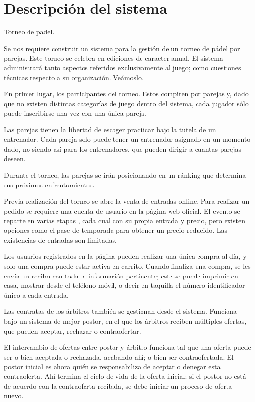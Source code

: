 \section{Descripción del sistema}
Torneo de padel.

Se nos requiere construir un sistema para la gestión de un torneo de pádel por parejas. Este torneo se celebra en ediciones de caracter anual. El sistema administrará tanto aspectos referidos exclusivamente al juego; como cuestiones técnicas respecto a su organización. Veámoslo.


En primer lugar, los participantes del torneo. Estos compiten por parejas y, dado que no existen distintas categorías de juego dentro del sistema, cada jugador sólo puede inscribirse una vez con una única pareja.

Las parejas tienen la libertad de escoger practicar bajo la tutela de un entrenador. Cada pareja solo puede tener un entrenador asignado en un momento dado, no siendo así para los entrenadores, que pueden dirigir a cuantas parejas deseen. 

Durante el torneo, las parejas se irán posicionando en un ránking que determina sus próximos enfrentamientos.


Previa realización del torneo se abre la venta de entradas online. Para realizar un pedido se requiere una cuenta de usuario en la página web oficial. El evento se reparte en varias etapas , cada cual con su propia entrada y precio, pero existen opciones como el pase de temporada para obtener un precio reducido. Las existencias de entradas son limitadas.

Los usuarios registrados en la página pueden realizar una única compra al día, y solo una compra puede estar activa en carrito. Cuando finaliza una compra, se les envía un recibo con toda la información pertinente; este se puede imprimir en casa, mostrar desde el teléfono móvil, o decir en taquilla el número identificador único a cada entrada.


Las contratas de los árbitros también se gestionan desde el sistema. Funciona bajo un sistema de mejor postor, en el que los árbitros reciben múltiples ofertas, que pueden aceptar, rechazar o contraofertar. 

El intercambio de ofertas entre postor y árbitro funciona tal que una oferta puede ser o bien aceptada o rechazada, acabando ahí; o bien ser contraofertada. El postor inicial es ahora quién se responsabiliza de aceptar o denegar esta contraoferta. Ahí termina el ciclo de vida de la oferta inicial: si el postor no está de acuerdo con la contraoferta recibida, se debe iniciar un proceso de oferta nuevo. 

